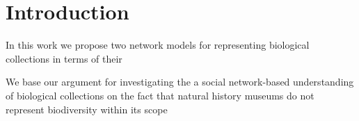 \chapter{Introduction}\label{introduction}


















In this work we propose two network models for representing biological collections in terms of their

We base our argument for investigating the  a social network-based understanding of biological collections on the fact that natural history museums do not represent biodiversity within its scope


